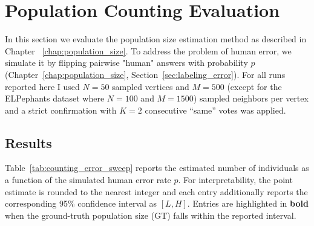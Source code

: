 \section{Population Counting Evaluation}
\label{sec:results_counting}

In this section we evaluate the population size estimation method as described in Chapter ~\ref{chap:population_size}. To address the problem of human error, we simulate it by flipping pairwise "human" answers with probability \(p\) (Chapter~\ref{chap:population_size}, Section~\ref{sec:labeling_error}). For all runs reported here I used \(N=50\) sampled vertices and \(M=500\) (except for the ELPephants dataset where \(N=100\) and \(M=1500\)) sampled neighbors per vertex and a strict confirmation with \(K=2\) consecutive ``same'' votes was applied. 



\subsection{Results}
\label{sec:results}
Table~\ref{tab:counting_error_sweep} reports the estimated number of individuals as a function of the simulated human error rate \(p\).
For interpretability, the point estimate is rounded to the nearest integer and each entry additionally reports the corresponding 95\% confidence interval as \([L, H]\).
Entries are highlighted in \textbf{bold} when the ground-truth population size (GT) falls within the reported interval.



